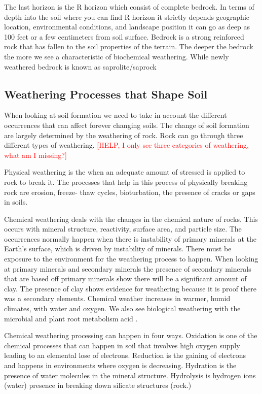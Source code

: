 The last horizon is the R horizon which consist of complete bedrock. In terms of depth into the soil where you can find R horizon it strictly depends geographic location, environmental conditions, and landscape position it can go as deep as 100 feet or a few centimeters from soil surface. Bedrock is a strong reinforced rock that has fallen to the soil properties of the terrain. The deeper the bedrock the more we see a characteristic of biochemical weathering. While newly weathered bedrock is known as saprolite/saprock 

\subsection{Weathering Processes that Shape Soil}

When looking at soil formation we need to take in account the different occurrences that can affect forever changing soils. The change of soil formation are largely determined by the weathering of rock. Rock can go through three different types of weathering. \textcolor{red}{[HELP, I only see three categories of weathering, what am I missing?]}

Physical weathering is the when an adequate amount of stressed is applied to rock to break it. The processes that help in this process of physically breaking rock are erosion, freeze- thaw cycles, bioturbation, the presence of cracks or gaps in soils. 

Chemical weathering deals with the changes in the chemical nature of rocks. This occurs with mineral structure, reactivity, surface area, and particle size. The occurrences normally happen when there is instability of primary minerals at the Earth's surface, which is driven by instability of minerals. There must be exposure to the environment for the weathering process to happen. When looking at primary minerals and secondary minerals the presence of secondary minerals that are based off primary minerals show there will be a significant amount of clay. The presence of clay shows evidence for weathering because it is proof there was a secondary elements. Chemical weather increases in warmer, humid climates, with water and oxygen. We also see biological weathering with the microbial and plant root metabolism acid \citep{brady2007colloidal}. 

Chemical weathering processing can happen in four ways. Oxidation is one of the chemical processes that can happen in soil that involves high oxygen supply leading to an elemental lose of electrons. Reduction is the gaining of electrons and happens in environments where oxygen is decreasing. Hydration is the presence of water molecules in the mineral structure. Hydrolysis is hydrogen ions (water) presence in breaking down silicate structures (rock.)
 

